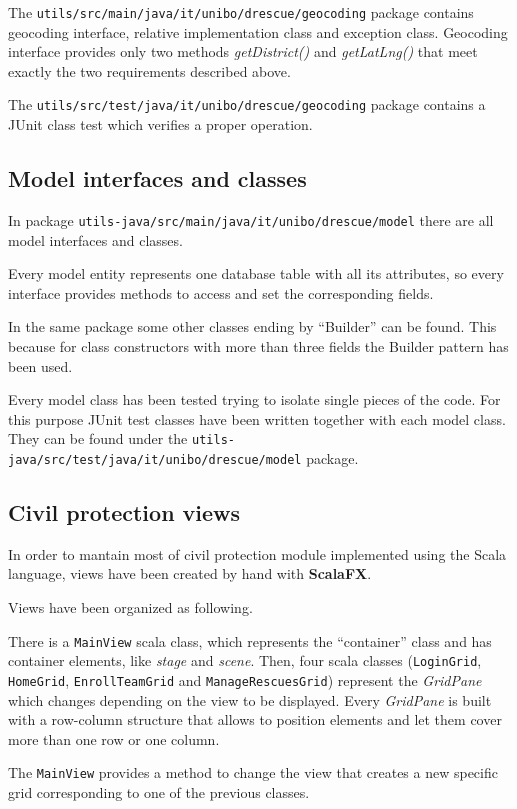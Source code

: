 \documentclass[a4paper,12pt]{report}
\begin{document}
The \texttt{utils/src/main/java/it/unibo/drescue/geocoding} package contains geocoding interface, relative implementation class and exception class. Geocoding interface provides only two methods \emph{getDistrict()} and \emph{getLatLng()} that meet exactly the two requirements described above.

The \texttt{utils/src/test/java/it/unibo/drescue/geocoding} package contains a JUnit class test which verifies a proper operation.

\subsection{Model interfaces and classes}
In package \texttt{utils-java/src/main/java/it/unibo/drescue/model} there are all model interfaces and classes.

Every model entity represents one database table with all its attributes, so every interface provides methods to access and set the corresponding fields.

In the same package some other classes ending by ``Builder'' can be found. This because for class constructors with more than three fields the Builder pattern has been used.

Every model class has been tested trying to isolate single pieces of the code. For this purpose JUnit test classes have been written together with each model class. They can be found under the \texttt{utils-java/src/test/java/it/unibo/drescue/model} package.

\subsection{Civil protection views}
In order to mantain most of civil protection module implemented using the Scala language, views have been created by hand with \textbf{ScalaFX}. 

Views have been organized as following.

There is a \texttt{MainView} scala class, which represents the ``container'' class and has container elements, like \textit{stage} and \textit{scene}.
Then, four scala classes (\texttt{LoginGrid}, \texttt{HomeGrid}, \texttt{EnrollTeamGrid} and \texttt{ManageRescuesGrid}) represent the \textit{GridPane} which changes depending on the view to be displayed.
Every \textit{GridPane} is built with a row-column structure that allows to position elements and let them cover more than one row or one column.

The \texttt{MainView} provides a method to change the view that creates a new specific grid corresponding to one of the previous classes.
\end{document}
